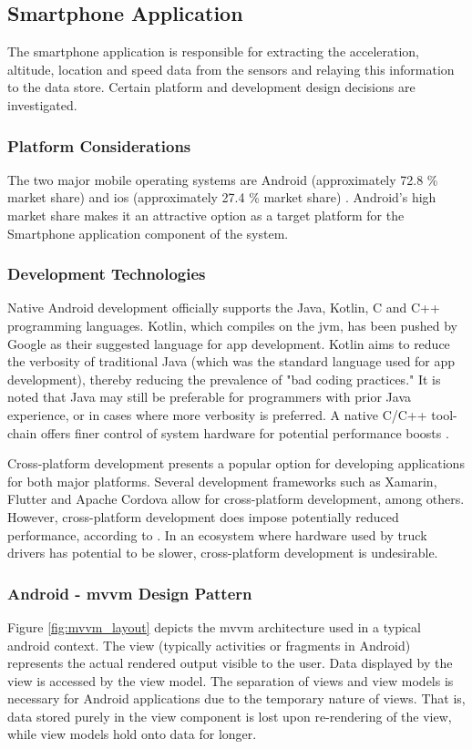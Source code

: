\subsection{Smartphone Application}
The smartphone application is responsible for extracting the acceleration, altitude, location and speed data from the sensors and relaying this information to the data store.
Certain platform and development design decisions are investigated.

\subsubsection{Platform Considerations}
The two major mobile operating systems are Android (approximately 72.8 \% market share) and \ac{ios} (approximately 27.4 \% market share) \cite{statcountermaketshare}.
Android's high market share makes it an attractive option as a target platform for the Smartphone application component of the system.

\subsubsection{Development Technologies}
Native Android development officially supports the Java, Kotlin, C and C++ programming languages.
Kotlin, which compiles on the \ac{jvm}, has been pushed by Google as their suggested language for app development.
Kotlin aims to reduce the verbosity of traditional Java (which was the standard language used for app development), thereby reducing the prevalence of "bad coding practices." \cite{flauzino2018you}
It is noted that Java may still be preferable for programmers with prior Java experience, or in cases where more verbosity is preferred.
A native C/C++ tool-chain offers finer control of system hardware for potential performance boosts \cite{kwan2012google}.

Cross-platform development presents a popular option for developing applications for both major platforms.
Several development frameworks such as Xamarin, Flutter and Apache Cordova allow for cross-platform development, among others.
However, cross-platform development does impose potentially reduced performance, according to \cite{biorn2020empirical}.
In an ecosystem where hardware used by truck drivers has potential to be slower, cross-platform development is undesirable.

\subsubsection{Android - \Ac{mvvm} Design Pattern}
Figure \ref{fig:mvvm_layout} depicts the \ac{mvvm} architecture used in a typical android context.
The view (typically activities or fragments in Android) represents the actual rendered output visible to the user.
Data displayed by the view is accessed by the view model.
The separation of views and view models is necessary for Android applications due to the temporary nature of views.
That is, data stored purely in the view component is lost upon re-rendering of the view, while view models hold onto data for longer.\cite{noauthor_guide_nodate}

